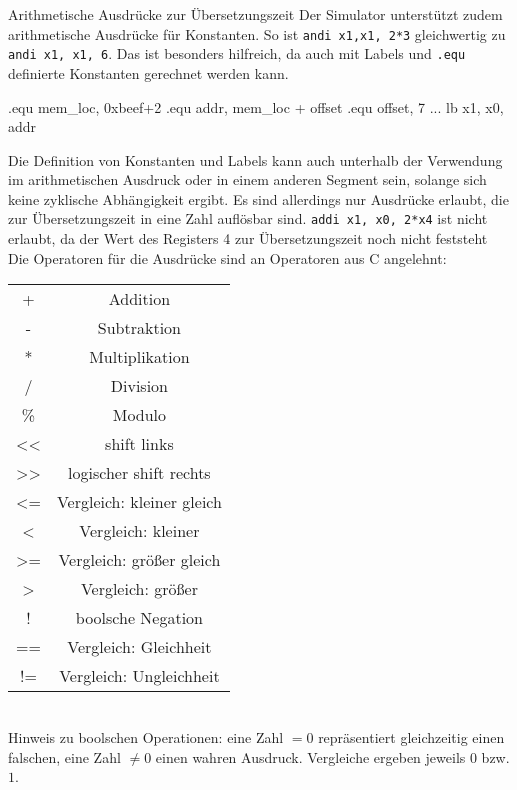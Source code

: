\begin{infoblock}{Arithmetische Ausdrücke zur Übersetzungszeit}
	Der Simulator unterstützt zudem arithmetische Ausdrücke für Konstanten. So ist \texttt{andi x1,x1, 2*3} gleichwertig zu \texttt{andi x1, x1, 6}. Das ist besonders hilfreich, da auch mit Labels und \texttt{.equ} definierte Konstanten gerechnet werden kann.\\
	\begin{riscv}
		.equ mem_loc, 0xbeef+2
		.equ addr, mem_loc + offset
		.equ offset, 7
		...
		lb x1, x0, addr
	\end{riscv}
	Die Definition von Konstanten und Labels kann auch unterhalb der Verwendung im arithmetischen Ausdruck oder in einem anderen Segment sein, solange sich keine zyklische Abhängigkeit ergibt. Es sind allerdings nur Ausdrücke erlaubt, die zur Übersetzungszeit in eine Zahl auflösbar sind. \texttt{addi x1, x0, 2*x4} ist nicht erlaubt, da der Wert des Registers 4 zur Übersetzungszeit noch nicht feststeht\\
	Die Operatoren für die Ausdrücke sind an Operatoren aus C angelehnt:\\
		\begin{tabular}{|c|c|}
			+ & Addition \\
			- & Subtraktion \\
			* & Multiplikation \\
			/ & Division \\
			\% & Modulo \\
			<< & shift links\\
			>> & logischer shift rechts\\
			<= & Vergleich: kleiner gleich\\
			< & Vergleich: kleiner\\
			>= & Vergleich: größer gleich\\
			> & Vergleich: größer\\
			! & boolsche Negation\\
			== & Vergleich: Gleichheit\\
			!= & Vergleich: Ungleichheit\\
		\end{tabular}\\
	Hinweis zu boolschen Operationen: eine Zahl $=0$ repräsentiert gleichzeitig einen falschen, eine Zahl $\neq 0$ einen wahren Ausdruck. Vergleiche ergeben jeweils $0$ bzw. $1$.
\end{infoblock}

